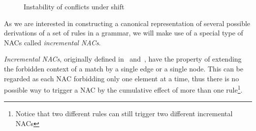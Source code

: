\begin{example}\label{ex:process:instability}

\begin{figure}[!ht]
  \centering
  \caption{Instability of conflicts under shift\\}\label{fig:process:instability}
\end{figure}

\end{example}

As we are interested in constructing a canonical representation of several possible derivations of a set of rules in a grammar, we will make use of a special type of NACs called \emph{incremental NACs}.

\emph{Incremental NACs}, originally defined in~\cite{Corradini2013} and~\cite{Corradini2014}, have the property of extending the forbidden context of a match by a single edge or a single node. This can be regarded as each NAC forbidding only one element at a time, thus there is no possible way to trigger a NAC by the cumulative effect of more than one rule\footnote{Notice that two different rules can still trigger two different incremental NACs}. 


